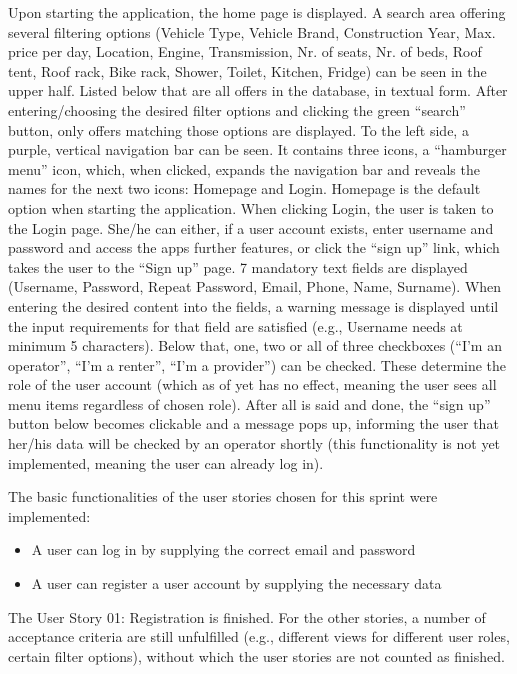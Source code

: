Upon starting the application, the home page is displayed. A search area offering several filtering options (Vehicle Type, Vehicle Brand, Construction Year, Max. price per day, Location, Engine, Transmission, Nr. of seats, Nr. of beds, Roof tent, Roof rack, Bike rack, Shower, Toilet, Kitchen, Fridge) can be seen in the upper half. Listed below that are all offers in the database, in textual form. After entering/choosing the desired filter options and clicking the green “search” button, only offers matching those options are displayed.
To the left side, a purple, vertical navigation bar can be seen. It contains three icons, a “hamburger menu” icon, which, when clicked, expands the navigation bar and reveals the names for the next two icons: Homepage and Login. Homepage is the default option when starting the application. When clicking Login, the user is taken to the Login page. She/he can either, if a user account exists, enter username and password and access the apps further features, or click the “sign up” link, which takes the user to the “Sign up” page. 7 mandatory text fields are displayed (Username, Password, Repeat Password, Email, Phone, Name, Surname). When entering the desired content into the fields, a warning message is displayed until the input requirements for that field are satisfied (e.g., Username needs at minimum 5 characters). Below that, one, two or all of three checkboxes (“I’m an operator”, “I’m a renter”, “I’m a provider”) can be checked. These determine the role of the user account (which as of yet has no effect, meaning the user sees all menu items regardless of chosen role). After all is said and done, the “sign up” button below becomes clickable and a message pops up, informing the user that her/his data will be checked by an operator shortly (this functionality is not yet implemented, meaning the user can already log in).

The basic functionalities of the user stories chosen for this sprint were implemented:

\begin{itemize}
    \item A user can log in by supplying the correct email and password
    \item A user can register a user account by supplying the necessary data
\end{itemize}

The User Story 01: Registration is finished. For the other stories, a number of acceptance criteria are still unfulfilled (e.g., different views for different user roles, certain filter options), without which the user stories are not counted as finished.

